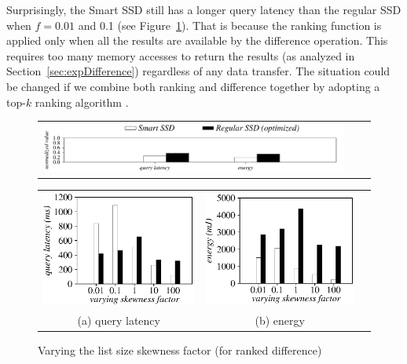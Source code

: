 Surprisingly, the Smart SSD still has a longer query latency than the regular SSD when $f=0.01$ and 0.1 (see Figure~\ref{fig:varyListSkewRankDifference}).
That is because the ranking function is applied only when all the results are available by the \textsf{difference} operation.
This requires too many memory accesses to return the results (as analyzed in Section~\ref{sec:expDifference}) regardless of any data transfer. The situation could be changed if we combine both ranking and difference together by adopting a top-$k$ ranking algorithm \cite{Fagin2001, Broder2003EQE}.


\begin{figure}[htbp]
  \centering
    \begin{tabular}{ccc}
 \includegraphics[width=0.52\columnwidth]{figures/banner2.pdf}%
\end{tabular}
\vspace{-0.1cm}
\renewcommand{\tabcolsep}{0.1mm}


  \begin{tabular}{ccc}
 \includegraphics[width=0.5\columnwidth]{figures/RankDifference-time-VaryListSkew.eps}&
  \includegraphics[width=0.5\columnwidth]{figures/RankDifference-energy-VaryListSkew.eps}\\
  (a) query latency & (b) energy
\end{tabular}

  \caption{Varying the list size skewness factor (for ranked difference)}
  \label{fig:varyListSkewRankDifference}
 \end{figure}

